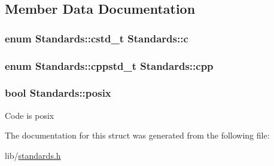 \subsection{Member Data Documentation}
\hypertarget{struct_standards_a89e7be6761f6fe1e897bac4e7fed4f89}{
\subsubsection[{c}]{\setlength{\rightskip}{0pt plus 5cm}enum {\bf Standards\-::cstd\-\_\-t}  Standards\-::c}}\label{struct_standards_a89e7be6761f6fe1e897bac4e7fed4f89}
\hypertarget{struct_standards_a09b39d1359bd629a599aa5ed9de93dcb}{
\subsubsection[{cpp}]{\setlength{\rightskip}{0pt plus 5cm}enum {\bf Standards\-::cppstd\-\_\-t}  Standards\-::cpp}}\label{struct_standards_a09b39d1359bd629a599aa5ed9de93dcb}
\hypertarget{struct_standards_ae98f2da6953f4ce65a761e1d15d76233}{
\subsubsection[{posix}]{\setlength{\rightskip}{0pt plus 5cm}bool Standards\-::posix}}\label{struct_standards_ae98f2da6953f4ce65a761e1d15d76233}
Code is posix 

The documentation for this struct was generated from the following file\-:\begin{DoxyCompactItemize}
\item 
lib/\hyperlink{standards_8h}{standards.\-h}\end{DoxyCompactItemize}
